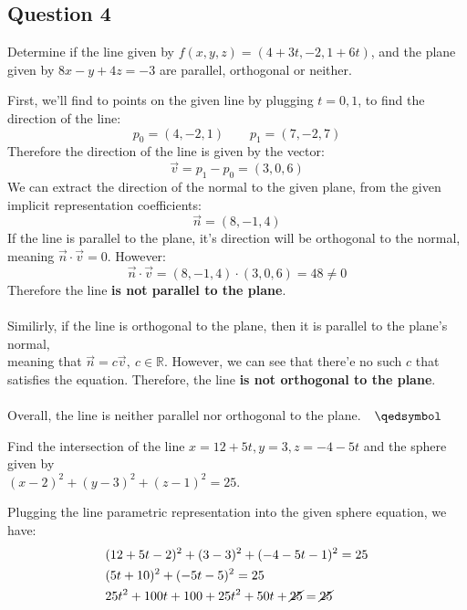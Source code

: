 \documentclass{article}
\begin{document}
    \subsection*{Question 4}
    \begin{enumerate}[(a)]
        \begin{framed}
            \item Determine if the line given by $f(x,y,z) = (4+3t,-2,1+6t)$, and the plane given by $8x-y+4z=-3$ are parallel, orthogonal or neither.
        \end{framed}
        First, we'll find to points on the given line by plugging $t=0,1$, to find the direction of the line:
        $$p_0 = (4,-2,1)\qquad p_1 = (7,-2,7)$$
        Therefore the direction of the line is given by the vector:
        $$\vec{v} = p_1 - p_0 = (3,0,6)$$
        We can extract the direction of the normal to the given plane, from the given implicit representation coefficients:
        $$\vec{n} = (8,-1,4)$$
        If the line is parallel to the plane, it's direction will be orthogonal to the normal, meaning $\vec{n}\cdot \vec{v} = 0$. However:
        $$\vec{n}\cdot\vec{v} = (8,-1,4)\cdot(3,0,6) = 48 \not= 0$$
        Therefore the line \textbf{is not parallel to the plane}.\\\\
        Similirly, if the line is orthogonal to the plane, then it is parallel to the plane's normal,\\meaning that $\vec{n} = c\vec{v},\ c\in\mathbb{R}$. However, we can see that there'e no such $c$ that satisfies the equation. Therefore, the line \textbf{is not orthogonal to the plane}.\\\\
        Overall, the line is neither parallel nor orthogonal to the plane.$\quad\qedsymbol$
        \vspace{1cm}
        \begin{framed}
            \item Find the intersection of the line $x=12+5t, y=3, z=-4-5t$ and the sphere given by\\$(x-2)^2 + (y-3)^2+(z-1)^2=25$.
        \end{framed}
        Plugging the line parametric representation into the given sphere equation, we have:
        \begin{align*}
            &(12+5t-2)^2 + (3-3)^2 + (-4-5t-1)^2 = 25\\
            &(5t+10)^2 + (-5t-5)^2 = 25\\
            &25t^2+100t+100+25t^2+50t+\cancel{25}=\cancel{25}\\

\end{align*}
\end{enumerate}
\end{document}
